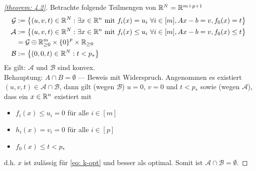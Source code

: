 \begin{proof}[\cref{theorem: 4.2}]
	Betrachte folgende Teilmengen von $\mathbb{R}^N = \mathbb{R}^{m+p+1}$
	\begin{equation*}
		\begin{aligned}
			\mathcal{G} &\mathrel{:=} \left\{ (u,v,t) \in \mathbb{R}^N : \exists x \in \mathbb{R}^n \text{ mit } f_i(x) = u_i \ \forall i \in [m] , Ax - b = v, f_0(x) = t \right\} \\
			\mathcal{A} &\mathrel{:=} \left\{ (u,v,t) \in \mathbb{R}^N : \exists x \in \mathbb{R}^n \text{ mit } f_i(x) \le u_i \ \forall i \in [m], Ax - b = v, f_0(x) \le t \right\} \\
			&= \mathcal{G} \oplus \mathbb{R}^m_{\ge 0} \times \left\{ 0 \right\}^p \times \mathbb{R}_{\ge 0} \\
			\mathcal{B} &\mathrel{:=} \left\{ (0,0,t) \in \mathbb{R}^N : t < p_\ast \right\}
		\end{aligned}
	\end{equation*}
	Es gilt: $\mathcal{A}$ und $\mathcal{B}$ sind konvex. \\
	Behauptung: $A \cap B = \emptyset$ --- Beweis mit Widerspruch. Angenommen es existiert $(u,v,t) \in \mathcal{A} \cap \mathcal{B}$, dann gilt (wegen $\mathcal{B}$) $u = 0$, $v=0$ und $t < p_\ast$ sowie (wegen $\mathcal{A}$), dass ein $x \in \mathbb{R}^n$ existiert mit 
	\begin{itemize}
		\item $f_i(x) \le u_i = 0$ für alle $i \in [m]$ 
		\item $h_i(x) = v_i = 0$ für alle $i \in [p]$
		\item $f_0(x) \le t < p_\ast$ 
	\end{itemize}
	d.h. $x$ ist zulässig für \eqref{eq: k-opt} und besser als optimal.
	Somit ist $\mathcal{A} \cap \mathcal{B} = \emptyset$.
	

\end{proof}
